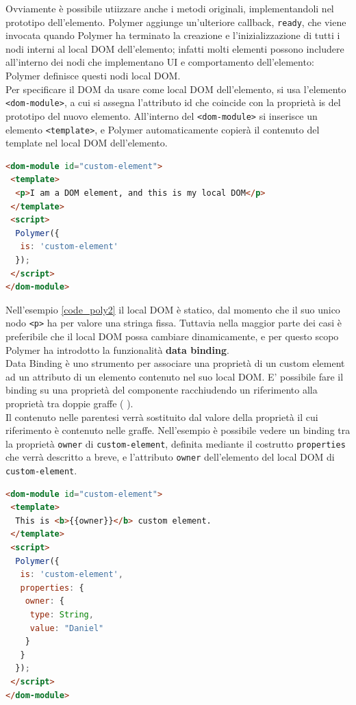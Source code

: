 Ovviamente è possibile utiizzare anche i metodi originali, implementandoli nel prototipo dell’elemento. Polymer aggiunge un’ulteriore callback, \texttt{ready}, che viene invocata quando Polymer ha terminato la creazione e l’inizializzazione di tutti i nodi interni al local DOM dell’elemento; infatti molti elementi possono includere all’interno dei nodi che implementano UI e comportamento dell’elemento: Polymer definisce questi nodi local DOM.
\\
Per specificare il DOM da usare come local DOM dell’elemento, si usa l’elemento \texttt{<dom-module>}, a cui si assegna l’attributo id che coincide con la proprietà is del prototipo del nuovo elemento. All’interno del \texttt{<dom-module>} si inserisce un elemento \texttt{<template>}, e Polymer automaticamente copierà il contenuto del template nel local DOM dell’elemento.
\begin{lstlisting}[language=html,label={code_poly2}]
<dom-module id="custom-element">
 <template>
  <p>I am a DOM element, and this is my local DOM</p>
 </template>
 <script>
  Polymer({
   is: 'custom-element'
  });
 </script>
</dom-module>
\end{lstlisting}
Nell’esempio \ref{code_poly2} il local DOM è statico, dal momento che il suo unico nodo \texttt{<p>} ha per valore una stringa fissa. Tuttavia nella maggior parte dei casi è preferibile che il local DOM possa cambiare dinamicamente, e per questo scopo Polymer ha introdotto la funzionalità \textbf{data binding}.
\\
Data Binding è uno strumento per associare una proprietà di un custom element ad un attributo di un elemento contenuto nel suo local DOM. E’ possibile fare il binding su una proprietà del componente racchiudendo un riferimento alla proprietà tra doppie graffe ({{ }}). 
\\
Il contenuto nelle parentesi verrà sostituito dal valore della proprietà il cui riferimento è contenuto nelle graffe. Nell’esempio è possibile vedere un binding tra la proprietà \texttt{owner} di \texttt{custom-element}, definita mediante il costrutto \texttt{properties} che verrà descritto a breve, e l’attributo \texttt{owner} dell’elemento del local DOM di \texttt{custom-element}. 
\begin{lstlisting}[language=html]
<dom-module id="custom-element">
 <template>
  This is <b>{{owner}}</b> custom element.
 </template>
 <script>
  Polymer({
   is: 'custom-element',
   properties: {
    owner: {
     type: String,
     value: "Daniel"
    }
   }
  });
 </script>
</dom-module>
\end{lstlisting}
